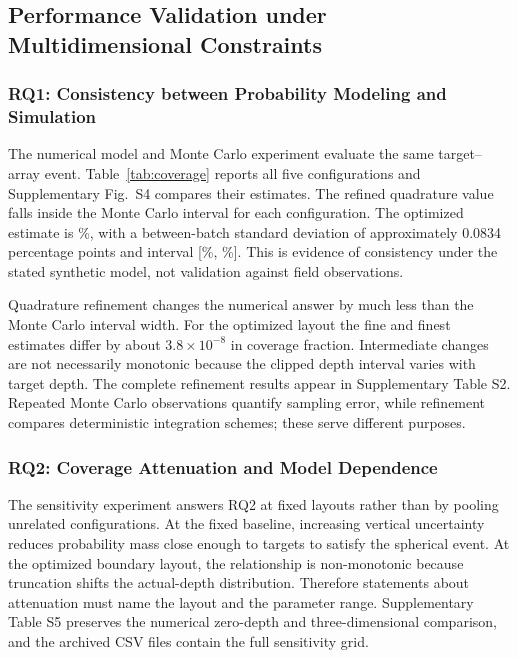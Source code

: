 \documentclass[fleqn,10pt]{wlscirep}
\begin{document}
\subsection*{Performance Validation under Multidimensional Constraints}
\subsubsection*{RQ1: Consistency between Probability Modeling and Simulation}
The numerical model and Monte Carlo experiment evaluate the same target--array event. Table~\ref{tab:coverage} reports all five configurations and Supplementary Fig.~S4 compares their estimates. The refined quadrature value falls inside the Monte Carlo interval for each configuration. The optimized estimate is \MCOpt\%, with a between-batch standard deviation of approximately 0.0834 percentage points and interval [\MCLow\%, \MCHigh\%]. This is evidence of consistency under the stated synthetic model, not validation against field observations.

Quadrature refinement changes the numerical answer by much less than the Monte Carlo interval width. For the optimized layout the fine and finest estimates differ by about $3.8\times10^{-8}$ in coverage fraction. Intermediate changes are not necessarily monotonic because the clipped depth interval varies with target depth. The complete refinement results appear in Supplementary Table S2. Repeated Monte Carlo observations quantify sampling error, while refinement compares deterministic integration schemes; these serve different purposes.

\begin{table}[htbp]\centering\small
\caption{\textbf{Controlled layout comparisons and independent validation.} Quadrature uses the finest rule. Monte Carlo (MC) summaries use 30 independent batches of 50,000 trials each. SD is the between-batch standard deviation in percentage points (pp); the interval is for the mean coverage. The single sensor is a node-count reference, while optimization gains use the matched nine-node fixed baseline.}\label{tab:coverage}

\end{table}



\subsubsection*{RQ2: Coverage Attenuation and Model Dependence}
The sensitivity experiment answers RQ2 at fixed layouts rather than by pooling unrelated configurations. At the fixed baseline, increasing vertical uncertainty reduces probability mass close enough to targets to satisfy the spherical event. At the optimized boundary layout, the relationship is non-monotonic because truncation shifts the actual-depth distribution. Therefore statements about attenuation must name the layout and the parameter range. Supplementary Table S5 preserves the numerical zero-depth and three-dimensional comparison, and the archived CSV files contain the full sensitivity grid.
\end{document}
